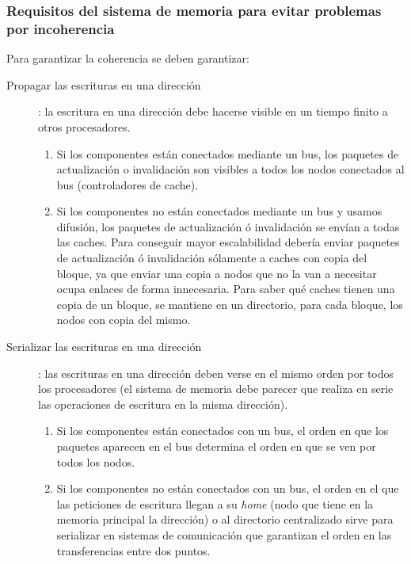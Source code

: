 \documentclass[10pt,a4paper,spanish]{report}
\begin{document}
\textcolor[rgb]{0.2,0.4,0.8}{\subsubsection{Requisitos del sistema de memoria para evitar problemas por incoherencia}}
Para garantizar la coherencia se deben garantizar:
\begin{description}
    \item[Propagar las escrituras en una dirección]: la escritura en una dirección debe hacerse visible en un tiempo finito a otros procesadores.
    \begin{enumerate}[\color{azul}{\bf $\heartsuit$}]
        \item Si los componentes están conectados mediante un bus, los paquetes de actualización o invalidación son visibles a todos los nodos conectados al bus (controladores de cache).
        \item Si los componentes no están conectados mediante un bus y usamos difusión, los paquetes de actualización ó invalidación se envían a todas las caches. Para conseguir mayor escalabilidad debería enviar paquetes de actualización ó invalidación sólamente a caches con copia del bloque, ya que enviar una copia a nodos que no la van a necesitar ocupa enlaces de forma innecesaria. Para saber qué caches tienen una copia de un bloque, se mantiene en un directorio, para cada bloque, los nodos con copia del mismo.
    \end{enumerate}
    \item[Serializar las escrituras en una dirección]: las escrituras en una dirección deben verse en el mismo orden por todos los procesadores (el sistema de memoria debe parecer que realiza en serie las operaciones de escritura en la misma dirección). 
    \begin{enumerate}[\color{azul}{\bf $\heartsuit$}]
        \item Si los componentes están conectados con un bus, el orden en que los paquetes aparecen en el bus determina el orden en que se ven por todos los nodos.
        \item Si los componentes no están conectados con un bus, el orden en el que las peticiones de escritura llegan a su \textcolor[rgb]{0.2,0.4,0.8}{\textit{home}} (nodo que tiene en la memoria principal la dirección) o al directorio centralizado sirve para serializar en sistemas de comunicación que garantizan el orden en las transferencias entre dos puntos.
    \end{enumerate}
\end{description}
\end{document}
